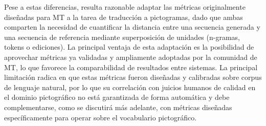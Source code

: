 Pese a estas diferencias, resulta razonable adaptar las métricas originalmente diseñadas para MT a la tarea de traducción a pictogramas, dado que ambas comparten la necesidad de cuantificar la distancia entre una secuencia generada y una secuencia de referencia mediante superposición de unidades (n-gramas, tokens o ediciones). La principal ventaja de esta adaptación es la posibilidad de aprovechar métricas ya validadas y ampliamente adoptadas por la comunidad de MT, lo que favorece la comparabilidad de resultados entre sistemas. La principal limitación radica en que estas métricas fueron diseñadas y calibradas sobre corpus de lenguaje natural, por lo que su correlación con juicios humanos de calidad en el dominio pictográfico no está garantizada de forma automática y debe complementarse, como se discutirá más adelante, con métricas diseñadas específicamente para operar sobre el vocabulario pictográfico.

